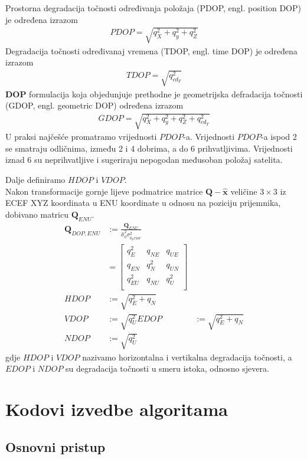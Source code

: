 \documentclass[a4paper,twoside,12pt]{memoir} %
\begin{document}
Prostorna degradacija točnosti određivanja položaja (PDOP, engl. position DOP) je određena izrazom
\begin{align}
PDOP = \sqrt{q_X^2+q_y^2+q_Z^2}
\end{align}
Degradacija točnosti određivanaj vremena (TDOP, engl. time DOP) je određena izrazom
\begin{align}
TDOP = \sqrt{q_{cd_T}^2}
\end{align}
\textbf{DOP} formulacija koja objedunjuje prethodne je geometrijska defradacija točnosti (GDOP, engl. geometric DOP) određena izrazom
\begin{align}
GDOP = \sqrt{q_X^2+q_y^2+q_Z^2+q_{cd_T}^2}
\end{align}
U praksi najčešće promatramo  vrijednosti $PDOP$-a. Vrijednosti $PDOP$-a ispod 2 se smatraju odličnima, između 2 i 4 dobrima, a do 6 prihvatljivima. Vrijednosti iznad 6 su neprihvatljive i sugeriraju nepogodan međusoban položaj satelita.

Dalje definiramo $HDOP$ i $VDOP$. \\
Nakon transformacije gornje lijeve podmatrice matrice $\mathbf{Q-{\hat{x}}}$ veličine $3 \times 3$ iz ECEF XYZ koordinata u ENU koordinate u odnosu na poziciju prijemnika, dobivano matricu $\mathbf{Q}_{ENU}$.
\begin{align}
\mathbf{Q}_{DOP,ENU} & := \frac{\mathbf{Q}_{ENU}}{\hat{\sigma}_0^2 \sigma_{0_prior}^2} \\
&=\begin{bmatrix}
q_E^2 & q_{NE} & q_{UE} \\
q_{EN} & q_{N}^2 & q_{UN} \\
q_{EU}^2 & q_{NU} & q_{U}^2 \\
\end{bmatrix}\\
HDOP & := \sqrt{q_E^2 + q_{N}} \\
VDOP & := \sqrt{q_U^2}
EDOP & := \sqrt{q_E^2 + q_{N}} \\
NDOP & := \sqrt{q_U^2}
\end{align}
gdje $HDOP$ i $VDOP$ nazivamo horizontalna i vertikalna degradacija točnosti, a
$EDOP$ i $NDOP$ su degradacija točnosti u smeru istoka, odnosno sjevera.

\chapter{Kodovi izvedbe algoritama}\label{appendix:izvedba}
\section{Osnovni pristup}
\end{document}
